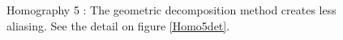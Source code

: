 \begin{figure}
\caption{Homography 5 : The geometric decomposition method creates less aliasing. See the detail on figure \ref{Homo5det}.}
\label{Homo5}
\end{figure}

